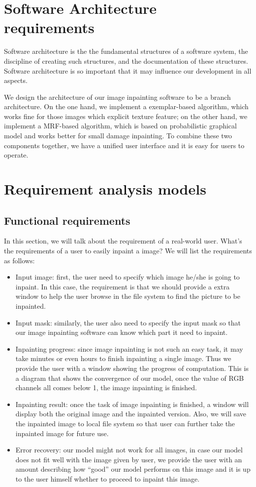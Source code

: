 \section{Software Architecture requirements}
Software architecture is the  the fundamental structures of a software system, the discipline of creating such structures, and the documentation of these structures. Software architecture is so important that it may influence our development in all aspects.

We design the architecture of our image inpainting software to be a branch architecture. On the one hand, we implement a exemplar-based algorithm, which works fine for those images which explicit texture feature; on the other hand, we implement a MRF-based algorithm, which is based on probabilistic graphical model and works better for small damage inpainting. To combine these two components together, we have a unified user interface and it is easy for users to operate.

\section{Requirement analysis models}
\subsection{Functional requirements}
In this section, we will talk about the requirement of a real-world user. What's the requirements of a user to easily inpaint a image? We will list the requirements as follows:
\begin{itemize}
\item Input image: first, the user need to specify which image he/she is going to inpaint. In this case, the requirement is that we should provide a extra window to help the user browse in the file system to find the picture to be inpainted.
\item Input mask: similarly, the user also need to specify the input mask so that our image inpainting software can know which part it need to inpaint.
\item Inpainting progress: since image inpainting is not such an easy task, it may take minutes or even hours to finish inpainting a single image. Thus we provide the user with a window showing the progress of computation. This is a diagram that shows the convergence of our model, once the value of RGB channels all comes below 1, the image inpainting is finished.
\item Inpainting result: once the task of image inpainting is finished, a window will display both the original image and the inpainted version. Also, we will save the inpainted image to local file system so that user can further take the inpainted image for future use.
\item Error recovery: our model might not work for all images, in case our model does not fit well with the image given by user, we provide the user with an amount describing how ``good'' our model performs on this image and it is up to the user himself whether to proceed to inpaint this image.
\end{itemize}
